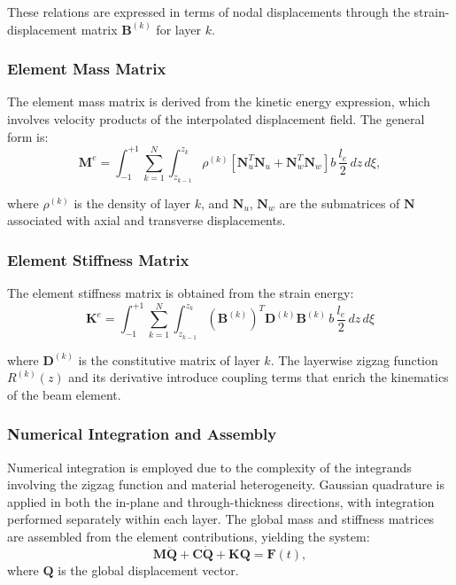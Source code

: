 \documentclass[12pt,a4paper]{report}
\begin{document}
These relations are expressed in terms of nodal displacements through the strain-displacement matrix $\mathbf{B}^{(k)}$ for layer $k$.

\subsubsection*{Element Mass Matrix}

The element mass matrix is derived from the kinetic energy expression, which involves velocity products of the interpolated displacement field. The general form is:
\begin{equation}
    \mathbf{M}^e = \int_{-1}^{+1} \sum_{k=1}^{N} \int_{z_{k-1}}^{z_k} 
\rho^{(k)} \left[ \mathbf{N}_u^T \mathbf{N}_u + \mathbf{N}_w^T \mathbf{N}_w \right] b \, \frac{l_e}{2} \, dz \, d\xi,
\end{equation}

where $\rho^{(k)}$ is the density of layer $k$, and $\mathbf{N}_u$, $\mathbf{N}_w$ are the submatrices of $\mathbf{N}$ associated with axial and transverse displacements.

\subsubsection*{Element Stiffness Matrix}

The element stiffness matrix is obtained from the strain energy:
\begin{equation}
    \mathbf{K}^e = \int_{-1}^{+1} \sum_{k=1}^{N} \int_{z_{k-1}}^{z_k} 
(\mathbf{B}^{(k)})^T \mathbf{D}^{(k)} \mathbf{B}^{(k)} \, b \, \frac{l_e}{2} \, dz \, d\xi
\end{equation}

where $\mathbf{D}^{(k)}$ is the constitutive matrix of layer $k$. The layerwise zigzag function $R^{(k)}(z)$ and its derivative introduce coupling terms that enrich the kinematics of the beam element.

\subsubsection*{Numerical Integration and Assembly}

Numerical integration is employed due to the complexity of the integrands involving the zigzag function and material heterogeneity. Gaussian quadrature is applied in both the in-plane and through-thickness directions, with integration performed separately within each layer. The global mass and stiffness matrices are assembled from the element contributions, yielding the system:
\begin{equation}
\mathbf{M} \ddot{\mathbf{Q}} + \mathbf{C} \dot{\mathbf{Q}} + \mathbf{K} \mathbf{Q} = \mathbf{F}(t),
\end{equation}
where $\mathbf{Q}$ is the global displacement vector.
\end{document}
